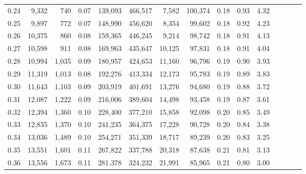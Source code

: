 \begin{tabular}{rrrcrrrrrrrrrrr}
0.24 &   9,332 &    740 &                                       0.07 &  139,093 &  466,517 &    7,582 &  100,374 &  0.18 &  0.93 &                         4.32 \\
0.25 &   9,897 &    772 &                                       0.07 &  148,990 &  456,620 &    8,354 &   99,602 &  0.18 &  0.92 &                         4.23 \\
0.26 &  10,375 &    860 &                                       0.08 &  159,365 &  446,245 &    9,214 &   98,742 &  0.18 &  0.91 &                         4.13 \\
0.27 &  10,598 &    911 &                                       0.08 &  169,963 &  435,647 &   10,125 &   97,831 &  0.18 &  0.91 &                         4.04 \\
0.28 &  10,994 &  1,035 &                                       0.09 &  180,957 &  424,653 &   11,160 &   96,796 &  0.19 &  0.90 &                         3.93 \\
0.29 &  11,319 &  1,013 &                                       0.08 &  192,276 &  413,334 &   12,173 &   95,783 &  0.19 &  0.89 &                         3.83 \\
0.30 &  11,643 &  1,103 &                                       0.09 &  203,919 &  401,691 &   13,276 &   94,680 &  0.19 &  0.88 &                         3.72 \\
0.31 &  12,087 &  1,222 &                                       0.09 &  216,006 &  389,604 &   14,498 &   93,458 &  0.19 &  0.87 &                         3.61 \\
0.32 &  12,394 &  1,360 &                                       0.10 &  228,400 &  377,210 &   15,858 &   92,098 &  0.20 &  0.85 &                         3.49 \\
0.33 &  12,835 &  1,370 &                                       0.10 &  241,235 &  364,375 &   17,228 &   90,728 &  0.20 &  0.84 &                         3.38 \\
0.34 &  13,036 &  1,489 &                                       0.10 &  254,271 &  351,339 &   18,717 &   89,239 &  0.20 &  0.83 &                         3.25 \\
0.35 &  13,551 &  1,601 &                                       0.11 &  267,822 &  337,788 &   20,318 &   87,638 &  0.21 &  0.81 &                         3.13 \\
0.36 &  13,556 &  1,673 &                                       0.11 &  281,378 &  324,232 &   21,991 &   85,965 &  0.21 &  0.80 &                         3.00 \\

\end{tabular}
